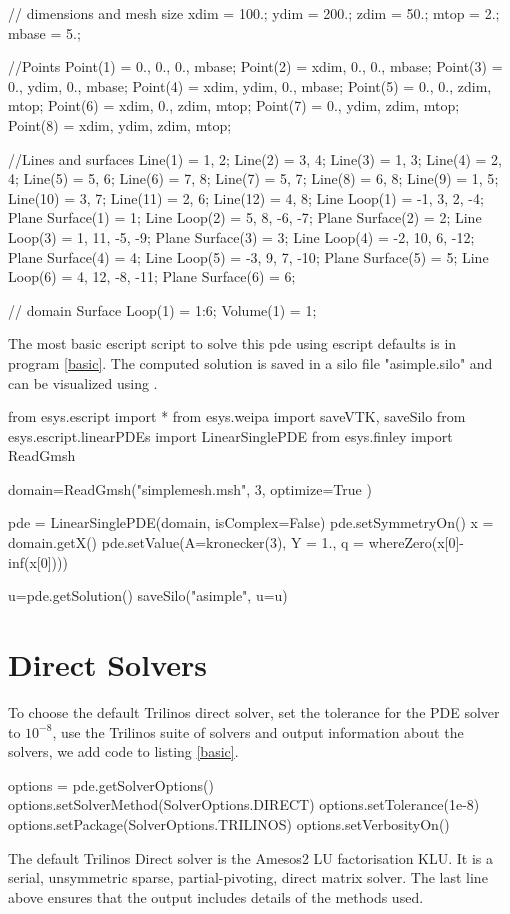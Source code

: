 \begin{python}[caption=simplemesh.geo,label=simplemesh]
// dimensions and mesh size
xdim = 100.;
ydim = 200.;
zdim = 50.;
mtop = 2.;
mbase = 5.;

//Points
Point(1) = {0., 0., 0., mbase};
Point(2) = {xdim, 0., 0., mbase};
Point(3) = {0., ydim, 0., mbase};
Point(4) = {xdim, ydim, 0., mbase};
Point(5) = {0., 0., zdim, mtop};
Point(6) = {xdim, 0., zdim, mtop};
Point(7) = {0., ydim, zdim, mtop};
Point(8) = {xdim, ydim, zdim, mtop};

//Lines and surfaces
Line(1) = {1, 2};
Line(2) = {3, 4};
Line(3) = {1, 3};
Line(4) = {2, 4};
Line(5) = {5, 6};
Line(6) = {7, 8};
Line(7) = {5, 7};
Line(8) = {6, 8};
Line(9) = {1, 5};
Line(10) = {3, 7};
Line(11) = {2, 6};
Line(12) = {4, 8};
Line Loop(1) = {-1, 3, 2, -4};
Plane Surface(1) = {1};
Line Loop(2) = {5, 8, -6, -7};
Plane Surface(2) = {2};
Line Loop(3) = {1, 11, -5, -9};
Plane Surface(3) = {3};
Line Loop(4) = {-2, 10, 6, -12};
Plane Surface(4) = {4};
Line Loop(5) = {-3, 9, 7, -10};
Plane Surface(5) = {5};
Line Loop(6) = {4, 12, -8, -11};
Plane Surface(6) = {6};

// domain
Surface Loop(1) = {1:6};
Volume(1) = {1};
\end{python}

The most basic escript script to solve this pde using escript defaults is in program \ref{basic}.  The computed solution is saved in a silo file "asimple.silo" and can be visualized using \VisIt.
\begin{python}[caption=basic solve using defaults only, label=basic ]
from esys.escript import *
from esys.weipa import saveVTK, saveSilo
from esys.escript.linearPDEs import LinearSinglePDE
from esys.finley import ReadGmsh
  
domain=ReadGmsh("simplemesh.msh", 3,  optimize=True )
       
pde = LinearSinglePDE(domain, isComplex=False)
pde.setSymmetryOn()
x = domain.getX()
pde.setValue(A=kronecker(3), Y = 1., q = whereZero(x[0]-inf(x[0])))

u=pde.getSolution()    
saveSilo("asimple", u=u)    
\end{python}




\section{Direct Solvers}
To choose the default Trilinos direct solver, set the tolerance for the PDE solver to $10^{-8}$,  use the Trilinos suite of solvers and output information about the solvers, we add code to listing \ref{basic}.
\begin{python}[caption=default Direct , label=defaultdirect ]
options = pde.getSolverOptions()  
options.setSolverMethod(SolverOptions.DIRECT)         
options.setTolerance(1e-8)        
options.setPackage(SolverOptions.TRILINOS)
options.setVerbosityOn()        
\end{python}
The default Trilinos Direct solver is the Amesos2 LU factorisation KLU. It is a serial, unsymmetric sparse, partial-pivoting, direct matrix solver.  The last line above ensures that the output includes details of the methods used.


